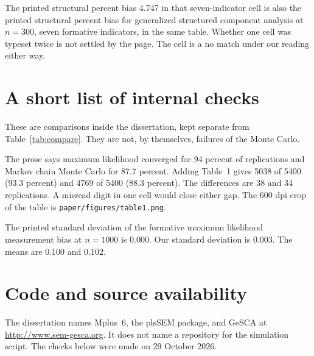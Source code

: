 \documentclass[11pt]{article}
\begin{document}
The printed structural percent bias 4.747 in that seven-indicator cell is
also the printed structural percent bias for generalized structured
component analysis at $n=300$, seven formative indicators, in the same
table. Whether one cell was typeset twice is not settled by the page. The
cell is a no match under our reading either way.

\section{A short list of internal checks}

These are comparisons inside the dissertation, kept separate from
Table~\ref{tab:compare}. They are not, by themselves, failures of the Monte
Carlo.

The prose says maximum likelihood converged for 94 percent of replications
and Markov chain Monte Carlo for 87.7 percent. Adding Table~1 gives 5038 of
5400 (93.3 percent) and 4769 of 5400 (88.3 percent). The differences are 38
and 34 replications. A misread digit in one cell would close either gap.
The 600 dpi crop of the table is \texttt{paper/figures/table1.png}.

The printed standard deviation of the formative maximum likelihood
measurement bias at $n=1000$ is 0.000. Our standard deviation is 0.003.
The means are 0.100 and 0.102.

\section{Code and source availability}

The dissertation names Mplus~6, the plsSEM package, and GeSCA at
\url{http://www.sem-gesca.org}. It does not name a repository for the
simulation script. The checks below were made on 29 October 2026.
\end{document}
